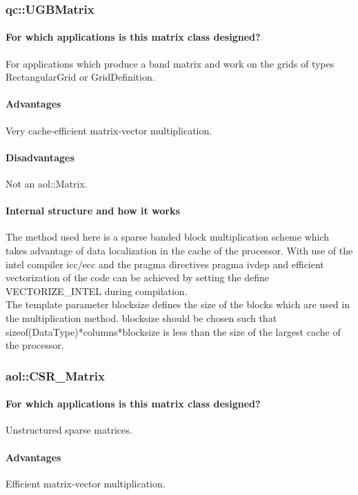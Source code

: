 \subsubsection{qc::UGBMatrix}
\paragraph{For which applications is this matrix class designed?}
For applications which produce a band matrix and work on the grids of
types RectangularGrid or GridDefinition.

\paragraph{Advantages}
Very cache-efficient matrix-vector multiplication.

\paragraph{Disadvantages}
Not an aol::Matrix.

\paragraph{Internal structure and how it works}
The method used here is a sparse banded block multiplication scheme
which takes advantage of data localization in the cache of the
processor. With use of the intel compiler icc/ecc and the pragma
directives pragma ivdep and efficient vectorization of the code can be
achieved by setting the define VECTORIZE\_INTEL during
compilation. \\
The template parameter blocksize defines the size of the blocks which
are used in the multiplication method. blocksize should be chosen such
that sizeof(DataType)*columns*blocksize is less than the size of the
largest cache of the processor.


\subsubsection{aol::CSR\_Matrix}
\paragraph{For which applications is this matrix class designed?}
Unstructured sparse matrices.

\paragraph{Advantages}
Efficient matrix-vector multiplication.

